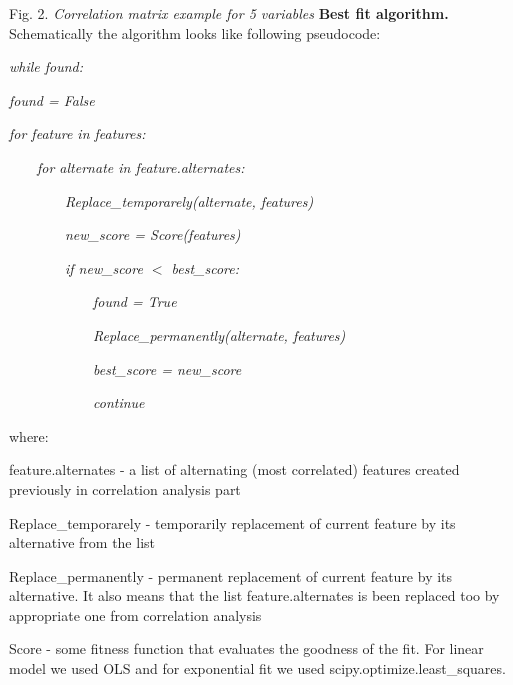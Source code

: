 \documentclass[aps,prl,reprint,amsmath,amssymb,nature]{revtex4-1}
\begin{document}
Fig. 2. \textit{Correlation matrix example for 5 variables}
\textbf{Best fit algorithm.} Schematically the algorithm looks like 
following pseudocode:

\textit{while found:}

\textit{found = False}

\textit{for feature in features:}

\ \ \ \ \textit{for alternate in feature.alternates:}

\ \ \ \ \ \ \ \ \textit{Replace\_temporarely(alternate, features)}

\ \ \ \ \ \ \ \ \textit{new\_score = Score(features)}

\ \ \ \ \ \ \ \ \textit{if new\_score $<$ best\_score:}

\ \ \ \ \ \ \ \ \ \ \ \ \textit{found = True}

\ \ \ \ \ \ \ \ \ \ \ \ \textit{Replace\_permanently(alternate, 
features)}

\ \ \ \ \ \ \ \ \ \ \ \ \textit{best\_score = new\_score}

\ \ \ \ \ \ \ \ \ \ \ \ \textit{continue}

where: 

feature.alternates - a list of alternating (most correlated) features 
created previously in correlation analysis part

Replace\_temporarely - temporarily replacement of current feature by its 
alternative from the list

Replace\_permanently - permanent replacement of current feature by its 
alternative. It also means that the list feature.alternates is been 
replaced too by appropriate one from correlation analysis

Score - some fitness function that evaluates the goodness of the fit. 
For linear model we used OLS and for exponential fit we used 
scipy.optimize.least\_squares.


\fi %
\end{document}
